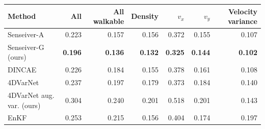 \begin{tabular}{lrrrrrr}
\toprule
Method & All & All walkable & Density & $v_x$ & $v_y$ & Velocity variance \\
\midrule
Senseiver-A & 0.223 & 0.157 & 0.156 & 0.372 & 0.155 & 0.107 \\
Senseiver-G (ours) & \textbf{0.196} & \textbf{0.136} & \textbf{0.132} & \textbf{0.325} & \textbf{0.144} & \textbf{0.102} \\
DINCAE & 0.226 & 0.184 & 0.155 & 0.378 & 0.161 & 0.108 \\
4DVarNet & 0.237 & 0.197 & 0.179 & 0.373 & 0.184 & 0.140 \\
4DVarNet aug. var. (ours) & 0.304 & 0.240 & 0.201 & 0.518 & 0.201 & 0.143 \\
EnKF & 0.253 & 0.215 & 0.156 & 0.404 & 0.174 & 0.197 \\
\bottomrule
\end{tabular}
